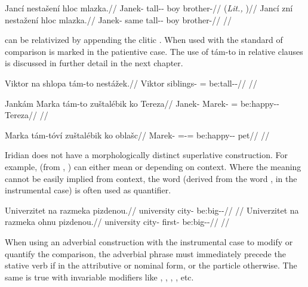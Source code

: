 \pex
\a
\begingl
\gla Janc\'i nesta\v{s}ení hloc mlazka.//
\glb Janek-\Gen{} tall-\Comp{}-\Att{} boy brother-\Dim{}//
\glft {} (\emph{Lit.,} )//
\endgl
\a
\begingl
\gla Janc\'i zní nesta\v{z}ení hloc mlazka.//
\glb Janek-\Gen{} same tall-\Comp{}-\Att{} boy brother-\Dim{}//
\glft {}//
\endgl
\xe

 can be relativized by appending the clitic . When used with  the standard of comparison is marked in the patientive case. The use of tám-to in relative clauses is discussed in further detail in the next chapter.

\ex
\begingl
\gla Viktor na shlopa tám-to nestá\v{z}ek.//
\glb Viktor \Loc{} siblings-\Pat{} \Comp{}=\Rz{} be:tall-\Av{}-\Pf{}//
\glft {}//
\endgl
\xe

\ex
\begingl
\gla Jankám Marka tám-to zuštalébik ko Tereza//
\glb Janek-\Agt{} Marek-\Pat{} \Comp{}=\Rz{} be:happy-\Ben{}-\Pf{} \Lnk{} Tereza//
\glft {}//
\endgl
\xe

\ex
\begingl
\gla Marka tám-tóví zuštalébik ko oblašc//
\glb Marek-\Pat{} \Comp{}=\Rz{}-\Gen{}= be:happy-\Ben{}-\Pf{} \Lnk{} pet//
\glft {}//
\endgl
\xe

Iridian does not have a morphologically distinct superlative construction. For example,  (from , ) can either mean  or  depending on context. Where the meaning cannot be easily implied from context, the word  (derived from the word ,  in the instrumental case) is often used as quantifier.

\pex
\a
\begingl
\gla Univerzitet na razmeka pizdenou.//
\glb university \Loc{} city-\Pat{} be:big-\Comp{}-\Nz{}//
\glft {}//
\endgl
\a
\begingl
\gla Univerzitet na razmeka ohnu pizdenou.//
\glb university \Loc{} city-\Pat{} first-\Ins{} be:big-\Comp{}-\Nz{}//
\glft {}//
\endgl
\xe

When using an adverbial construction with the instrumental case to modify or quantify the comparison, the adverbial phrase must immediately precede the stative verb if in the attributive or nominal form, or the particle  otherwise. The same is true with invariable modifiers like , , , , etc.

